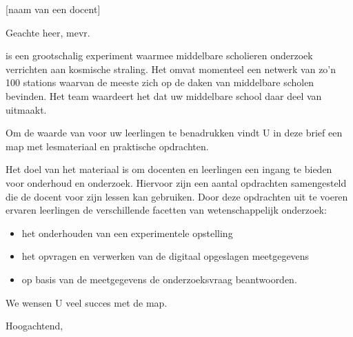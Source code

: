 

\signature{Het \hisparc team}
\address{Science Park 105\\
         1098 XG \\
         Amsterdam}



\begin{letter}{[naam van een docent] \\ [middelbare school staan]}

\opening{Geachte heer, mevr.} %

\hisparc is een grootschalig experiment waarmee middelbare scholieren
onderzoek verrichten aan kosmische straling. Het omvat momenteel een
netwerk van zo'n 100 stations waarvan de meeste zich op de daken van
middelbare scholen bevinden. Het \hisparc team waardeert het dat uw
middelbare school daar deel van uitmaakt.  

Om de waarde van \hisparc voor uw leerlingen te benadrukken vindt U in
deze brief een \hisparc map met lesmateriaal en praktische opdrachten.

Het doel van het materiaal is om docenten en leerlingen een ingang te bieden voor onderhoud en onderzoek. Hiervoor zijn een aantal opdrachten samengesteld die de docent voor zijn lessen kan gebruiken.
Door deze opdrachten uit te voeren ervaren leerlingen de verschillende
facetten van wetenschappelijk onderzoek:
\begin{itemize}
	\item  het onderhouden van een experimentele opstelling
	\item  het opvragen en verwerken van de digitaal opgeslagen meetgegevens
	\item op basis van de meetgegevens de onderzoeksvraag beantwoorden. 
\end{itemize}
We wensen U veel succes met de \hisparc map.
\\
 
\closing{Hoogachtend,}

 
\end{letter}


